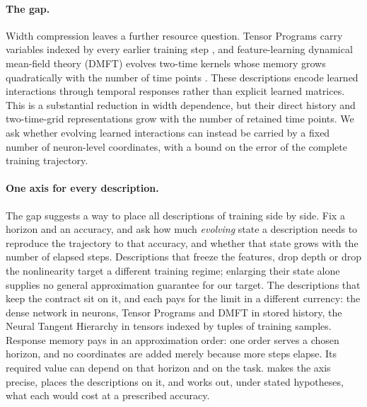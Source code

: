 \documentclass[11pt]{article}
\theoremstyle{definition}
\theoremstyle{remark}
\begin{document}
\paragraph{The gap.}
Width compression leaves a further resource question.  Tensor Programs
carry variables indexed by every earlier training step \citep{yang2021tensor},
and feature-learning dynamical mean-field theory (DMFT) evolves two-time kernels
whose memory grows quadratically with the number of time points
\citep{bordelon2022dmft}.  These descriptions encode learned interactions
through temporal responses rather than explicit learned matrices.  This is a
substantial reduction in width dependence, but their direct history and
two-time-grid representations grow with the number of retained time points.
We ask whether evolving learned interactions can instead be carried by a fixed
number of neuron-level coordinates, with a bound on the error of the complete
training trajectory.

\paragraph{One axis for every description.}
The gap suggests a way to place all descriptions of training side by side.  Fix
a horizon and an accuracy, and ask how much \emph{evolving} state a description
needs to reproduce the trajectory to that accuracy, and whether that state grows
with the number of elapsed steps.  Descriptions that freeze the features, drop
depth or drop the nonlinearity target a different training regime; enlarging
their state alone supplies no general approximation guarantee for our target.
The descriptions that keep the
contract sit on it, and each pays for the limit in a different currency: the
dense network in neurons, Tensor Programs and DMFT in stored history, the Neural
Tangent Hierarchy in tensors indexed by tuples of training samples.  Response
memory pays in an approximation order: one order serves a chosen horizon, and
no coordinates are added merely because more steps elapse.  Its required value
can depend on that horizon and on the task.   makes the
axis precise,  places the descriptions on it, and 
works out, under stated hypotheses, what each would cost at a prescribed
accuracy.
\end{document}
